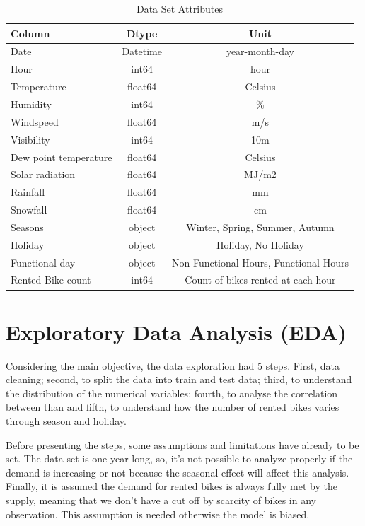 \documentclass[11pt, a4]{article}
\begin{document}
\begin{table}[h!]
\centering
\begin{tabular}{l c c}
\toprule
\textbf{Column} & \textbf{Dtype} & \textbf{Unit} \\
\midrule
Date & Datetime & year-month-day\\
Hour & int64 & hour\\
Temperature & float64 & Celsius\\
Humidity & int64 & \% \\ 
Windspeed & float64 & m/s \\
Visibility & int64  & 10m\\
Dew point temperature & float64 & Celsius\\
Solar radiation & float64 & MJ/m2\\
Rainfall & float64 & mm\\
Snowfall & float64 & cm \\
Seasons & object & Winter, Spring, Summer, Autumn\\
Holiday & object & Holiday, No Holiday \\
Functional day & object & Non Functional Hours, Functional Hours\\
Rented Bike count & int64 & Count of bikes rented at each hour\\
\bottomrule
\end{tabular}
\caption{Data Set Attributes}
\label{table:1}
\end{table}

\section*{Exploratory Data Analysis (EDA)}

Considering the main objective, the data exploration had 5 steps. First, data cleaning; second, to split the data into train and test data; third, to understand the distribution of the numerical variables; fourth, to analyse the correlation between than and fifth, to understand how the number of rented bikes varies through season and holiday.

Before presenting the steps, some assumptions and limitations have already to be set. The data set is one year long, so, it’s not possible to analyze properly if the demand is increasing or not because the seasonal effect will affect this analysis. Finally, it is assumed the demand for rented bikes is always fully met by the supply, meaning that we don’t have a cut off by scarcity of bikes in any observation. This assumption is needed otherwise the model is biased.
\end{document}
